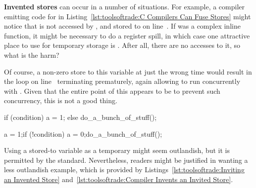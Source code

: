 \begin{lineref}
{\bf Invented stores} can occur in a number of situations.
For example, a compiler emitting code for  in
Listing~\ref{lst:toolsoftrade:C Compilers Can Fuse Stores}
might notice that  is not accessed by
, and stored to on line~.
If  was a complex inline function, it might be
necessary to do a register spill, in which case one attractive
place to use for temporary storage is .
After all, there are no accesses to it, so what is the harm?

Of course, a non-zero store to this variable at just the wrong time
would result in the  loop on
line~ terminating
prematurely, again allowing  to run
concurrently with .
Given that the entire point of this  appears to be to
prevent such concurrency, this is not a good thing.
\end{lineref}

\begin{listing}[tbp]
\begin{linelabel}
\begin{VerbatimL}[commandchars=\\\{\}]
if (condition)
	a = 1;
else
	do_a_bunch_of_stuff();
\end{VerbatimL}
\end{linelabel}
\caption{Inviting an Invented Store}
\label{lst:toolsoftrade:Inviting an Invented Store}
\end{listing}

\begin{listing}[tbp]
\begin{linelabel}
\begin{VerbatimL}[commandchars=\\\[\]]
a = 1;
if (!condition) {
	a = 0;
	do_a_bunch_of_stuff();
}
\end{VerbatimL}
\end{linelabel}
\caption{Compiler Invents an Invited Store}
\label{lst:toolsoftrade:Compiler Invents an Invited Store}
\end{listing}

Using a stored-to variable as a temporary might seem outlandish,
but it is permitted by the standard.
Nevertheless, readers might be justified in wanting a less
outlandish example, which is provided by
Listings~\ref{lst:toolsoftrade:Inviting an Invented Store}
and~\ref{lst:toolsoftrade:Compiler Invents an Invited Store}.

